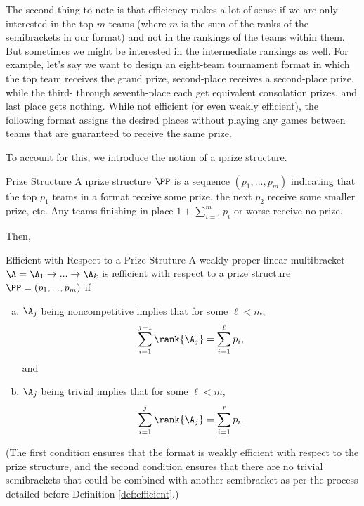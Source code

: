 {    The second thing to note is that efficiency makes a lot of sense if we are only interested in the top-$m$ teams (where $m$ is the sum of the ranks of the semibrackets in our format) and not in the rankings of the teams within them. But sometimes we might be interested in the intermediate rankings as well. For example, let's say we want to design an eight-team tournament format in which the top team receives the grand prize, second-place receives a second-place prize, while the third- through seventh-place each get equivalent consolation prizes, and last place gets nothing. While not efficient (or even weakly efficient), the following format assigns the desired places without playing any games between teams that are guaranteed to receive the same prize.


    To account for this, we introduce the notion of a \i{prize structure}.
    
    \begin{definition}{Prize Structure}{}
        A \i{prize structure} $\PP$ is a sequence $(p_1, ..., p_m)$ indicating that the top $p_1$ teams in a format receive some prize, the next $p_2$ receive some smaller prize, etc. Any teams finishing in place $1 + \sum_{i=1}^m p_i$ or worse receive no prize.
    \end{definition}

    Then,

    \begin{definition}{Efficient with Respect to a Prize Struture}{}
        A weakly proper linear multibracket $\A = \A_1 \to ... \to \A_k$ is \i{efficient with respect to a prize structure} $\PP = (p_1, ..., p_m)$ if
        \begin{enumerate}[(a)]
            \item $\A_j$ being noncompetitive implies that for some $\ell < m$, $$\sum_{i=1}^{j-1} \rank {\A_j} = \sum_{i=1}^\ell p_i,$$
                         and
            \item $\A_j$ being trivial implies that for some $\ell < m$, $$\sum_{i=1}^{j} \rank {\A_j} = \sum_{i=1}^\ell p_i.$$
        \end{enumerate}
    \end{definition}

    (The first condition ensures that the format is weakly efficient with respect to the prize structure, and the second condition ensures that there are no trivial semibrackets that could be combined with another semibracket as per the process detailed before Definition \ref{def:efficient}.)

}

